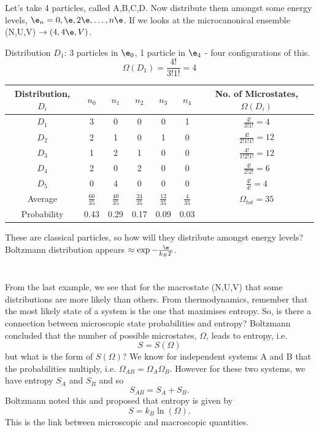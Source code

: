 \documentclass[a4paper, 11pt, normalem]{report}
\begin{document}
\begin{example}
Let's take 4 particles, called A,B,C,D.
Now distribute them amongst some energy levels, $\e_n = 0, \e, 2\e, \dots, n\e$.
If we looks at the microcanonical ensemble (N,U,V) $\to (4,4\e,V)$.

Distribution $D_1$: 3 particles in $\e_0$, 1 particle in $\e_4$ - four configurations of this.
\begin{equation}
    \Omega(D_1) = \frac{4!}{3!1!} = 4
\end{equation}
\begin{table}[H]
\centering
\begin{tabular}{|c||c|c|c|c|c||c|}
    \hline
    Distribution, $D_i$ & $n_0$ & $n_1$ & $n_2$ & $n_3$ & $n_4$ & No. of Microstates, $\Omega(D_i)$ \\
    \hline
    $D_1$ & 3 & 0 & 0 & 0 & 1 & $\frac{4!}{3!1!} = 4$ \\
    $D_2$ & 2 & 1 & 0 & 1 & 0 & $\frac{4!}{2!1!1!} = 12$ \\
    $D_3$ & 1 & 2 & 1 & 0 & 0 & $\frac{4!}{1!2!1!} = 12$ \\
    $D_4$ & 2 & 0 & 2 & 0 & 0 & $\frac{4!}{2!2!} = 6$ \\
    $D_5$ & 0 & 4 & 0 & 0 & 0 & $\frac{4!}{4!} = 4$ \\
    \hline
    Average & $\frac{60}{35}$ & $\frac{40}{35}$ & $\frac{24}{35}$ & $\frac{12}{35}$ & $\frac{4}{35}$ & $\Omega_{tot} = 35$ \\
    \hline
    Probability & 0.43 & 0.29 & 0.17 & 0.09 & 0.03 & \\
    \hline
\end{tabular}
\end{table}
These are classical particles, so how will they distribute amongst energy levels?\\ 
Boltzmann distribution appears $\approx \exp{-\frac{\e}{k_BT}}$.
\end{example}

\chapter{}
From the last example, we see that for the macrostate (N,U,V) that some distributions are more likely than others.
From thermodynamics, remember that the most likely state of a system is the one that maximises entropy.
So, is there a connection between microscopic state probabilities and entropy?
Boltzmann concluded that the number of possible microstates, $\Omega$, leads to entropy, i.e.
\begin{equation}
    S = S(\Omega)
\end{equation}
but what is the form of $S(\Omega)$?
We know for independent systems A and B that the probabilities multiply, i.e. $\Omega_{AB} = \Omega_A\Omega_B$.
However for these two systems, we have entropy $S_A$ and $S_B$ and so
\begin{equation}
    S_{AB} = S_A + S_B.
\end{equation}
Boltzmann noted this and proposed that entropy is given by
\begin{equation}
    S = k_B\ln(\Omega).
\end{equation}
This is the link between microscopic and macroscopic quantities.
\end{document}
